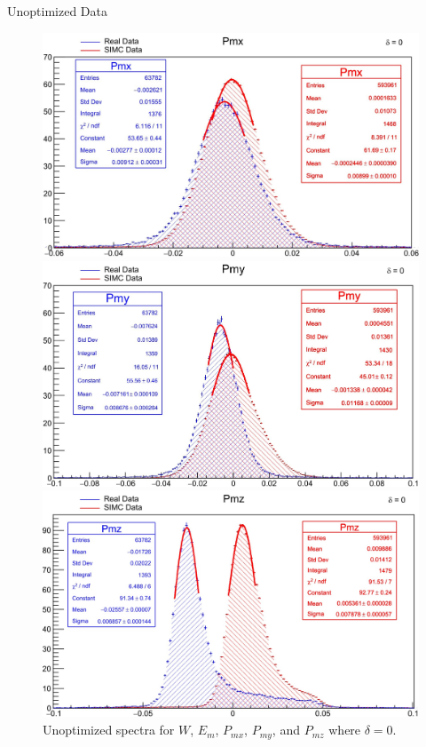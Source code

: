 \documentclass[final]{beamer}
\newlength{\colwidth}
\begin{document}
\begin{frame}[t]
\begin{columns}[t]
\begin{column}{\colwidth}
\begin{block}{Unoptimized Data}
\begin{figure}
 \begin{minipage}[t]{0.3\textwidth}
    \includegraphics[width=\linewidth]{uncalibrated data/Pmx_0.jpg}
  \end{minipage}
  \begin{minipage}[t]{0.3\textwidth}
    \includegraphics[width=\linewidth]{uncalibrated data/Pmy_0.jpg}
  \end{minipage}
  \begin{minipage}[t]{0.3\textwidth}
    \includegraphics[width=\linewidth]{uncalibrated data/Pmz_0.jpg}
  \end{minipage}
\vspace{-1cm}
  \caption{Unoptimized spectra for $W$, $E_m$, $P_{mx}$, $P_{my}$, and $P_{mz}$ where $\delta = 0$.}
\end{figure}
\vspace{-1cm}


\end{block}
\end{column}
\end{columns}
\end{frame}
\end{document}
